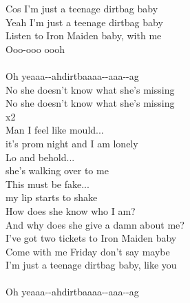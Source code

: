 Cos I’m just a teenage dirtbag baby \\
Yeah I’m just a teenage dirtbag baby \\
Listen to Iron Maiden baby, with me\\
Ooo-ooo oooh\\
  \\
Oh yeaaa--ahdirtbaaaa--aaa--ag\\
No she doesn’t know what she’s missing\\
No she doesn’t know what she’s missing\\
   x2\\
Man I feel like mould... \\
it’s prom night and I am lonely\\
Lo and behold... \\
she’s walking over to me\\
This must be fake... \\
my lip starts to shake\\
How does she know who I am? \\
And why does she give a damn about me?\\
I’ve got two tickets to Iron Maiden baby \\
Come with me Friday don’t say maybe \\
I’m just a teenage dirtbag baby, like you\\
  \\
Oh yeaaa--ahdirtbaaaa--aaa--ag\\
